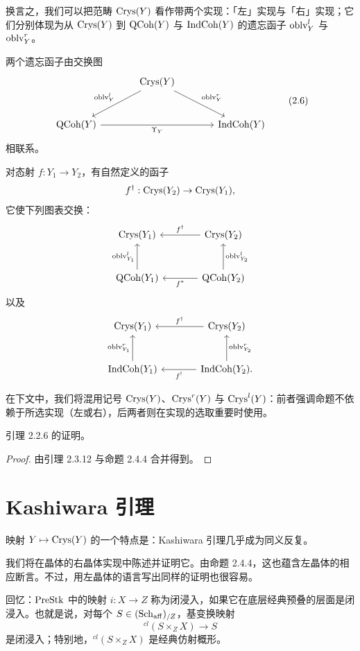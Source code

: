 换言之，我们可以把范畴 $\mathrm{Crys}(Y)$ 看作带两个实现：「左」实现与「右」实现；它们分别体现为从 $\mathrm{Crys}(Y)$ 到 $\mathrm{QCoh}(Y)$ 与 $\mathrm{IndCoh}(Y)$ 的遗忘函子 $\mathrm{oblv}^l_Y$ 与 $\mathrm{oblv}^r_Y$。

两个遗忘函子由交换图
\begin{equation}
\begin{tikzcd}[column sep=large, row sep=large]
 & \Crys(Y) \arrow[dl, "\oblv^l_Y"'] \arrow[dr, "\oblv^r_Y"] & \\
 \QCoh(Y) \arrow[rr, "\Upsilon_Y"'] & & \IndCoh(Y)
\end{tikzcd}\tag{2.6}
\end{equation}
相联系。

对态射 $f:Y_1\to Y_2$，有自然定义的函子
\[
f^{\dagger}:\mathrm{Crys}(Y_2)\to\mathrm{Crys}(Y_1),
\]
它使下列图表交换：
\[
\begin{tikzcd}[column sep=large, row sep=large]
 \Crys(Y_1) & \Crys(Y_2) \arrow[l, "f^{\dagger}"'] \\
 \QCoh(Y_1) \arrow[u, "\oblv^l_{Y_1}"] & \QCoh(Y_2) \arrow[l, "f^*"] \arrow[u, "\oblv^l_{Y_2}"']
\end{tikzcd}
\]
以及
\[
\begin{tikzcd}[column sep=large, row sep=large]
 \Crys(Y_1) & \Crys(Y_2) \arrow[l, "f^{\dagger}"'] \\
 \IndCoh(Y_1) \arrow[u, "\oblv^r_{Y_1}"] & \IndCoh(Y_2) \arrow[l, "f^!"] \arrow[u, "\oblv^r_{Y_2}"'].
\end{tikzcd}
\]

在下文中，我们将混用记号 $\mathrm{Crys}(Y)$、$\mathrm{Crys}^r(Y)$ 与 $\mathrm{Crys}^l(Y)$：前者强调命题不依赖于所选实现（左或右），后两者则在实现的选取重要时使用。

引理 2.2.6 的证明。
\begin{proof}
由引理 2.3.12 与命题 2.4.4 合并得到。
\end{proof}

\section{Kashiwara 引理}

映射 $Y\mapsto\mathrm{Crys}(Y)$ 的一个特点是：Kashiwara 引理几乎成为同义反复。

我们将在晶体的右晶体实现中陈述并证明它。由命题 2.4.4，这也蕴含左晶体的相应断言。不过，用左晶体的语言写出同样的证明也很容易。

回忆：$\mathrm{PreStk}$ 中的映射 $i:X\to Z$ 称为闭浸入，如果它在底层经典预叠的层面是闭浸入。也就是说，对每个 $S\in(\mathrm{Sch}_{\mathrm{aff}})_{/Z}$，基变换映射
\[
{}^{cl}(S\times_Z X)\to S
\]
是闭浸入；特别地，${}^{cl}(S\times_Z X)$ 是经典仿射概形。

